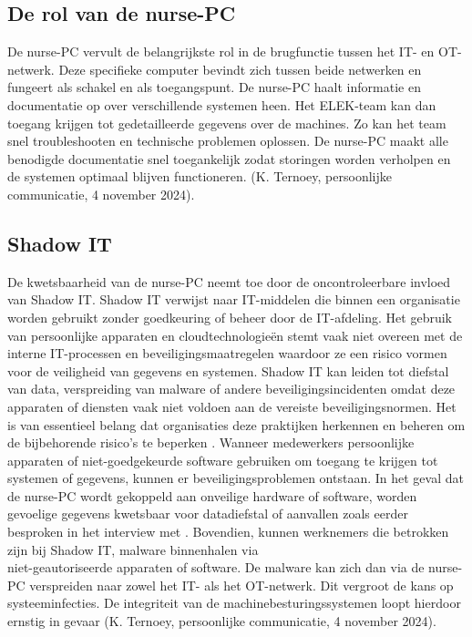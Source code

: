 \subsection{De rol van de nurse-PC} 
De nurse-PC vervult de belangrijkste rol in de brugfunctie tussen het IT- en OT-netwerk. Deze specifieke computer bevindt 
zich tussen beide netwerken en fungeert als schakel en als toegangspunt. De nurse-PC haalt informatie en documentatie op over verschillende systemen heen.
Het ELEK-team kan dan toegang krijgen tot gedetailleerde gegevens over de machines. 
Zo kan het team snel troubleshooten en technische problemen oplossen. 
De nurse-PC maakt alle benodigde documentatie snel toegankelijk zodat storingen worden verholpen en de systemen optimaal blijven functioneren. (K. Ternoey, persoonlijke communicatie, 4 november 2024).

\subsection{Shadow IT}
De kwetsbaarheid van de nurse-PC neemt toe door de oncontroleerbare invloed van Shadow IT.
Shadow IT verwijst naar IT-middelen die binnen een organisatie worden gebruikt zonder goedkeuring of beheer door de IT-afdeling.
Het gebruik van persoonlijke apparaten en cloudtechnologieën stemt vaak niet overeen met de interne IT-processen en beveiligingsmaatregelen waardoor ze een 
risico vormen voor de veiligheid van gegevens en systemen. Shadow IT kan leiden tot diefstal van data, 
verspreiding van malware of andere beveiligingsincidenten omdat deze apparaten of diensten vaak niet voldoen aan de vereiste beveiligingsnormen. 
Het is van essentieel belang dat organisaties deze praktijken herkennen en beheren om de bijbehorende risico’s te beperken \autocite{NCSC2023}.
Wanneer medewerkers persoonlijke apparaten of niet-goedgekeurde software gebruiken om toegang te krijgen tot systemen of gegevens, kunnen er beveiligingsproblemen 
ontstaan. In het geval dat de nurse-PC wordt gekoppeld aan onveilige hardware of software, worden gevoelige gegevens kwetsbaar voor 
datadiefstal of aanvallen zoals eerder besproken in het interview met \textcite{Hecker2021}.
Bovendien, kunnen werknemers die betrokken zijn bij Shadow IT, malware binnenhalen via \\ niet-geautoriseerde apparaten of software. 
De malware kan zich dan via de nurse-PC verspreiden naar zowel het IT- als het OT-netwerk. 
Dit vergroot de kans op systeeminfecties. De integriteit van de machinebesturingssystemen loopt hierdoor ernstig in
gevaar (K. Ternoey, persoonlijke communicatie, 4 november 2024).

